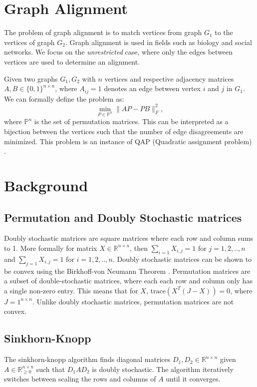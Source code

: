 \documentclass{article}
\begin{document}
\section{Graph Alignment}
The problem of graph alignment is to match vertices from graph $G_1$ to the vertices of graph $G_2$. Graph alignment is used in fields such as biology and social networks. We focus on the \emph{unrestricted} case, where only the edges between vertices are used to determine an alignment.

Given two graphs $G_1, G_2$ with $n$ vertices and respective adjacency matrices $A, B \in \{ 0, 1 \}^{n \times n}$, where $A_{ij} = 1$ denotes an edge between vertex $i$ and $j$ in $G_1$. We can formally define the problem as:
$$ \min_{P \in \mathds{P}^n} \lVert AP-PB \rVert^2_F, $$
where $\mathds{P}^n$ is the set of permutation matrices. This can be interpreted as a bijection between the vertices such that the number of edge disagreements are minimized. This problem is an instance of QAP (Quadratic assignment problem) \citep{fan2020spectral}.

\section{Background}
\subsection{Permutation and Doubly Stochastic matrices}
Doubly stochastic matrices are square matrices where each row and column sums to 1. More formally for matrix $X \in \mathds{R}^{n \times n}$, then $\sum_{i = 1} X_{i,j} = 1$ for $j = 1, 2, .., n$ and $\sum_{j = 1} X_{i,j} = 1$ for $i = 1, 2, .., n$. Doubly stochastic matrices can be shown to be convex using the Birkhoff-von Neumann Theorem \citep{birkhoff1946three}. Permutation matrices are a subset of double-stochastic matrices, where each each row and column only has a single non-zero entry. This means that for $X$, $\text{trace}(X^T(J-X)) = 0$, where $J = 1^{n \times n}$. Unlike doubly stochastic matrices, permutation matrices are not convex.

\subsection{Sinkhorn-Knopp}
The sinkhorn-knopp algorithm \citep{sinkhorn1967concerning} finds diagonal matrices $D_1, D_2 \in \mathds{R}^{n \times n}$ given $A \in \mathds{R}_{\ge 0}^{n \times n}$ such that $D_1 A D_2$ is doubly stochastic. The algorithm iteratively switches between scaling the rows and columns of $A$ until it converges.
\end{document}

